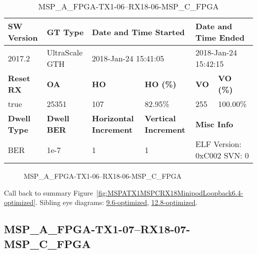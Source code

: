 \begin{table}[h]
\centering
\caption{MSP\_A\_FPGA-TX1-06--RX18-06-MSP\_C\_FPGA}
\label{tab:MSPAFPGATX106RX1806MSPCFPGA6.4-optimized}
\begin{tabular}{@{}|l|l|l|l|l|l|@{}}
\toprule
\textbf{SW Version}                & \textbf{GT Type}   & \multicolumn{2}{l|}{\textbf{Date and Time Started}}            & \multicolumn{2}{l|}{\textbf{Date and Time Ended}}        \\ \midrule
2017.2                       & UltraScale GTH          & \multicolumn{2}{l|}{2018-Jan-24 15:41:05}                   & \multicolumn{2}{l|}{2018-Jan-24 15:42:15}               \\ \midrule
\textbf{Reset RX}                  & \textbf{OA} & \textbf{HO}   & \textbf{HO (\%)} & \textbf{VO} & \textbf{VO (\%)} \\ \midrule
true & 25351        & 107          & 82.95\%        & 255        & 100.00\%       \\ \midrule
\textbf{Dwell Type}                & \textbf{Dwell BER} & \textbf{Horizontal Increment} & \textbf{Vertical Increment}    & \multicolumn{2}{l|}{\textbf{Misc Info}}                  \\ \midrule
BER                            & 1e-7        & 1        & 1           & \multicolumn{2}{l|}{ELF Version: 0xC002 SVN: 0}                         \\ \bottomrule
\end{tabular}
\end{table}

\begin{figure}[h]
\caption{MSP\_A\_FPGA-TX1-06--RX18-06-MSP\_C\_FPGA} \label{fig:MSPAFPGATX106RX1806MSPCFPGA6.4-optimized}
\end{figure}

Call back to summary Figure~\ref{fig:MSPATX1MSPCRX18MinipodLoopback6.4-optimized}.
Sibling eye diagrams: \hyperref[sec:MSPAFPGATX106RX1806MSPCFPGA9.6-optimized]{9.6-optimized}, \hyperref[sec:MSPAFPGATX106RX1806MSPCFPGA12.8-optimized]{12.8-optimized}.

\clearpage
\newpage


\subsection{MSP\_A\_FPGA-TX1-07--RX18-07-MSP\_C\_FPGA}\label{sec:MSPAFPGATX107RX1807MSPCFPGA6.4-optimized}

